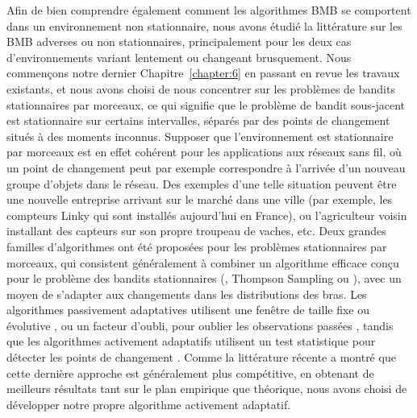 \begin{resume_fr}
%
Afin de bien comprendre également comment les algorithmes BMB se comportent dans un environnement non stationnaire, nous avons étudié la littérature sur les BMB adverses ou non stationnaires, principalement pour les deux cas d'environnements variant lentement ou changeant brusquement.
Nous commençons notre dernier Chapitre~\ref{chapter:6} en passant en revue les travaux existants,
et nous avons choisi de nous concentrer sur les problèmes de bandits stationnaires par morceaux,
ce qui signifie que le problème de bandit sous-jacent est stationnaire sur certains intervalles, séparés par des points de changement situés à des moments inconnus.
Supposer que l'environnement est stationnaire par morceaux est en effet cohérent pour les applications aux réseaux sans fil, où un point de changement peut par exemple correspondre à l'arrivée d'un nouveau groupe d'objets dans le réseau. Des exemples d'une telle situation peuvent être une nouvelle entreprise arrivant sur le marché dans une ville (par exemple, les compteurs Linky qui sont installés aujourd'hui en France), ou l'agriculteur voisin installant des capteurs sur son propre troupeau de vaches, etc.
%
Deux grandes familles d'algorithmes ont été proposées pour les problèmes stationnaires par morceaux,
qui consistent généralement à combiner un algorithme efficace conçu pour le problème des bandits stationnaires (\eg, Thompson Sampling ou \klUCB), avec un moyen de s'adapter aux changements dans les distributions des bras.
Les algorithmes passivement adaptatives utilisent une fenêtre de taille fixe ou évolutive \cite{Garivier11UCBDiscount}, ou un facteur d'oubli, pour oublier les observations passées \cite{Kocsis06,Gupta11thompson},
tandis que les algorithmes activement adaptatifs utilisent un test statistique pour détecter les points de changement \cite{MellorShapiro13,Allesiardo15}.
%
Comme la littérature récente a montré que cette dernière approche est généralement plus compétitive, en obtenant de meilleurs résultats tant sur le plan empirique que théorique, nous avons choisi de développer notre propre algorithme activement adaptatif.


\end{resume_fr}
